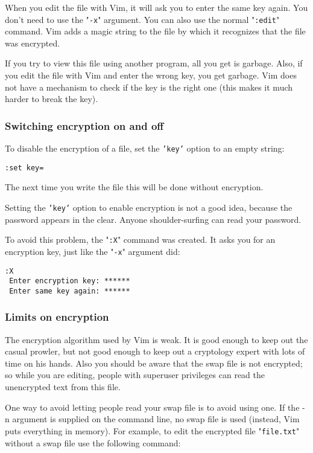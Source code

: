 When you edit the file with Vim, it will ask you to enter the same key again.
You don't need to use the "\texttt{-x}" argument.
You can also use the normal "\texttt{:edit}" command.
Vim adds a magic string to the file by which it recognizes that the file was encrypted.

If you try to view this file using another program, all you get is garbage.
Also, if you edit the file with Vim and enter the wrong key, you get garbage.
Vim does not have a mechanism to check if the key is the right one (this makes it much harder to break the key).
\subsubsection{Switching encryption on and off}
To disable the encryption of a file, set the \texttt{'key'} option to an empty string:

\begin{Verbatim}[samepage=true]
 :set key=
\end{Verbatim}

The next time you write the file this will be done without encryption.

Setting the \texttt{'key'} option to enable encryption is not a good idea, because the password appears in the clear.
Anyone shoulder-surfing can read your password.

To avoid this problem, the "\texttt{:X}" command was created.
It asks you for an encryption key, just like the "\texttt{-x}" argument did:

\begin{Verbatim}[samepage=true]
 :X
 Enter encryption key: ******
 Enter same key again: ******
\end{Verbatim}

\subsubsection{Limits on encryption}
The encryption algorithm used by Vim is weak.
It is good enough to keep out the casual prowler, but not good enough to keep out a cryptology expert with lots of time on his hands.
Also you should be aware that the swap file is not encrypted; so while you are editing, people with superuser privileges can read the unencrypted text from this file.

One way to avoid letting people read your swap file is to avoid using one.
If the -n argument is supplied on the command line, no swap file is used (instead, Vim puts everything in memory).
For example, to edit the encrypted file "\texttt{file.txt}" without a swap file use the following command:

